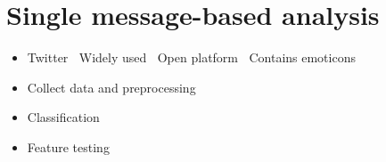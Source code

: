 \documentclass[
paper=128mm:96mm, %
fontsize=11pt, %
pagesize, %
parskip=half-, %
]{scrartcl} %
\newcommand{\red}[1]{\textit{\color{red}{#1}}}
\theoremstyle{mythmstyle} %
\begin{document}

\clearpage


\section{Single message-based analysis}


\begin{itemize}
\item Twitter
\subitem \textbullet $\:$ Widely used \red{REFERENCE PAPERS}
\subitem \textbullet $\:$ Open platform
\subitem \textbullet $\:$ Contains emoticons

\item Collect data and preprocessing
\item Classification
\item Feature testing
\end{itemize}
\end{document}
